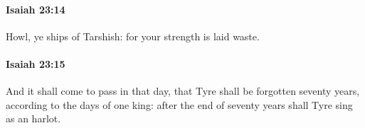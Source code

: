 		\paragraph{Isaiah 23:14} %
			\label{ISAIAH-23-14}

			Howl, ye ships of Tarshish: for your strength is laid waste.


		\paragraph{Isaiah 23:15} %
			\label{ISAIAH-23-15}

			And it shall come to pass in that day, that Tyre shall be forgotten seventy years, according to the days of one king: after the end of seventy years shall Tyre sing as an harlot.


